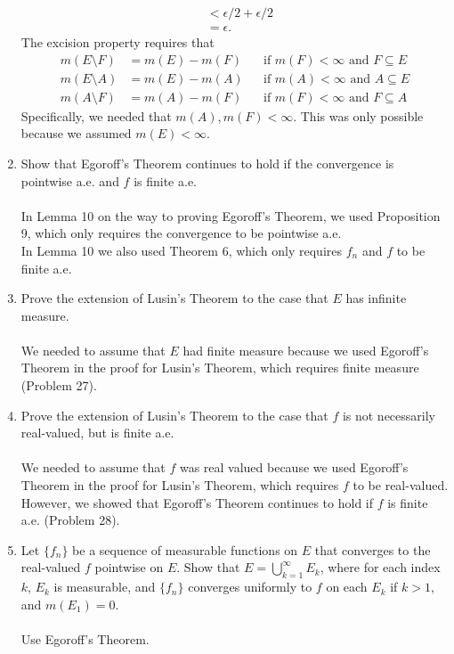 \begin{enumerate}
\begin{align*}
        &<\epsilon/2+\epsilon/2\\
        &=\epsilon.
    \end{align*}
    The excision property requires that
    \begin{align*}
        m(E\setminus F)&=m(E)-m(F)&&\text{if }m(F)<\infty\text{ and }F\subseteq E\\
        m(E\setminus A)&=m(E)-m(A)&&\text{if }m(A)<\infty\text{ and }A\subseteq E\\
        m(A\setminus F)&=m(A)-m(F)&&\text{if }m(F)<\infty\text{ and }F\subseteq A
    \end{align*}
    Specifically, we needed that $m(A),m(F)<\infty$. This was only possible because we assumed $m(E)<\infty$.
    \item Show that Egoroff's Theorem continues to hold if the convergence is pointwise a.e. and $f$ is finite a.e.\\
    \\In Lemma 10 on the way to proving Egoroff's Theorem, we used Proposition 9, which only requires the convergence to be pointwise a.e.
    \\In Lemma 10 we also used Theorem 6, which only requires $f_n$ and $f$ to be finite a.e. 
    \item Prove the extension of Lusin's Theorem to the case that $E$ has infinite measure.\\
    \\We needed to assume that $E$ had finite measure because we used Egoroff's Theorem in the proof for Lusin's Theorem, which requires finite measure (Problem 27).
    \item Prove the extension of Lusin's Theorem to the case that $f$ is not necessarily real-valued, but is finite a.e.\\
    \\We needed to assume that $f$ was real valued because we used Egoroff's Theorem in the proof for Lusin's Theorem, which requires $f$ to be real-valued.
    However, we showed that Egoroff's Theorem continues to hold if $f$ is finite a.e. (Problem 28).
    \item Let $\{f_n\}$ be a sequence of measurable functions on $E$ that converges to the real-valued $f$ pointwise on $E$. 
    Show that $E=\bigcup_{k=1}^\infty E_k$, where for each index $k$, $E_k$ is measurable, and $\{f_n\}$ converges uniformly to $f$ on each $E_k$ if $k>1$, and $m(E_1)=0$.\\
    \\Use Egoroff's Theorem.
\end{enumerate}